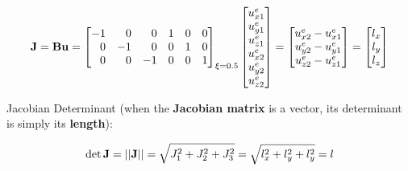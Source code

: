 \begin{equation}
    \mathbf{J} = \mathbf{B} \mathbf{u} =
    \begin{bmatrix}
        -1 & \phantom{-}0 & \phantom{-}0 & 1 & 0 & 0 \\
        \phantom{-}0 & -1 & \phantom{-}0 & 0 & 1 & 0  \\
        \phantom{-}0 & \phantom{-}0 & -1 & 0 & 0 & 1  \\
    \end{bmatrix}_{\xi=0.5}
    \begin{bmatrix}
        u_{x1}^e \\
        u_{y1}^e \\
        u_{z1}^e \\
        u_{x2}^e \\
        u_{y2}^e \\
        u_{z2}^e \\
    \end{bmatrix}
    = \begin{bmatrix}
        u_{x2}^e - u_{x1}^e \\
        u_{y2}^e - u_{y1}^e \\
        u_{z2}^e - u_{z1}^e \\
    \end{bmatrix}
    = \begin{bmatrix}
        l_x \\
        l_y \\
        l_z \\
    \end{bmatrix}
\end{equation}

\begin{qbox}

    Jacobian Determinant (when the \textbf{Jacobian matrix} is a vector, its
    determinant is simply its \textbf{length}):

\end{qbox}

\begin{equation}
    \det \mathbf{J} = || \mathbf{J} || = \sqrt{J_1^2 + J_2^2 + J_3^2}
               = \sqrt{l_x^2 + l_y^2 + l_y^2} = l
\end{equation}


